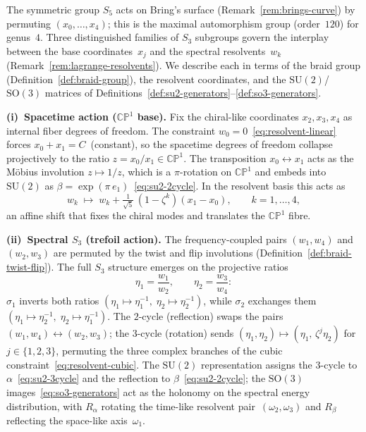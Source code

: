 \begin{remark}
\label{rem:braid-group-action}
The symmetric group $S_5$ acts on Bring's surface
(Remark~\ref{rem:brings-curve}) by permuting
$(x_0,\dots,x_4)$; this is the maximal automorphism group
(order~$120$) for genus~$4$.  Three distinguished families of $S_3$
subgroups govern the interplay between the base coordinates~$x_j$ and the
spectral resolvents~$w_k$
(Remark~\ref{rem:lagrange-resolvents}).  We describe each in terms of the
braid group (Definition~\ref{def:braid-group}), the resolvent coordinates,
and the $\mathrm{SU}(2)$/$\mathrm{SO}(3)$ matrices of
Definitions~\ref{def:su2-generators}--\ref{def:so3-generators}.

\medskip
\noindent\textbf{(i)~Spacetime action ($\mathbb{CP}^1$ base).}\;
Fix the chiral-like coordinates $x_2,x_3,x_4$ as internal fiber
degrees of freedom.  The constraint
$w_0=0$~\eqref{eq:resolvent-linear} forces $x_0+x_1=C$~(constant), so
the spacetime degrees of freedom collapse projectively to the ratio
$z=x_0/x_1\in\mathbb{CP}^1$.  The transposition
$x_0\leftrightarrow x_1$ acts as the M\"obius involution
$z\mapsto 1/z$, which is a $\pi$-rotation on $\mathbb{CP}^1$ and embeds
into $\mathrm{SU}(2)$ as $\beta=\exp(\pi\,e_1)$~\eqref{eq:su2-2cycle}.
In the resolvent basis this acts as
\begin{equation}\label{eq:spacetime-shift}
  w_k\;\longmapsto\;
  w_k+\tfrac{1}{\sqrt{5}}\,(1-\zeta^k)(x_1-x_0),
  \qquad k=1,\dots,4,
\end{equation}
an affine shift that fixes the chiral modes and translates the
$\mathbb{CP}^1$ fibre.

\medskip
\noindent\textbf{(ii)~Spectral $S_3$ (trefoil action).}\;
The frequency-coupled pairs $(w_1,w_4)$ and $(w_2,w_3)$ are permuted by
the twist and flip involutions
(Definition~\ref{def:braid-twist-flip}).
The full
$S_3$ structure emerges on the projective ratios
\[
  \eta_1=\frac{w_1}{w_2},\qquad\eta_2=\frac{w_3}{w_4}:
\]
$\sigma_1$ inverts both ratios $(\eta_1\mapsto\eta_1^{-1},\;
\eta_2\mapsto\eta_2^{-1})$, while $\sigma_2$ exchanges them
$(\eta_1\mapsto\eta_2^{-1},\;\eta_2\mapsto\eta_1^{-1})$.  The
$2$-cycle (reflection) swaps the pairs
$(w_1,w_4)\leftrightarrow(w_2,w_3)$; the $3$-cycle (rotation) sends
$(\eta_1,\eta_2)\mapsto(\eta_1,\,\zeta^j\eta_2)$ for $j\in\{1,2,3\}$,
permuting the three complex branches of the cubic
constraint~\eqref{eq:resolvent-cubic}.  The
$\mathrm{SU}(2)$ representation assigns the $3$-cycle to
$\alpha$~\eqref{eq:su2-3cycle} and the reflection to
$\beta$~\eqref{eq:su2-2cycle}; the $\mathrm{SO}(3)$
images~\eqref{eq:so3-generators} act as the holonomy on the spectral
energy distribution, with $R_\alpha$ rotating the time-like resolvent
pair~$(\omega_2,\omega_3)$ and $R_\beta$ reflecting the space-like
axis~$\omega_1$.


\end{remark}
